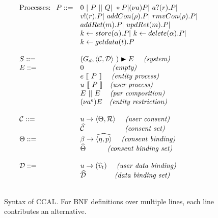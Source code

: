 \vspace{-8mm}
\begin{figure}[H]
\begin{equation*}
\begin{array}{lll}
\textrm{Processes: } \  P ::=  & 0  \ | \  P \ || \ Q  | \  * P  |  (\nu a) P |   \ a?(r). P  | & \\    
& v !( r ). P  | \ addCon(\rho). P  | \ rmvCon(\rho). P |& \\
& addRet(m). P  | \ updRet(m). P  |& \\
& k \leftarrow store(\alpha)  . P |   \ k \leftarrow delete(\alpha) . P  | &\\
&   k \leftarrow getdata(t). P &\\
 & & \\
S  :: =    & (G_d ,  \langle   \mathcal{C} , \mathcal{D} \rangle\ )  \blacktriangleright E  \ \ \ \textit{ (system)}  \\
E  ::= &   0  \quad  \quad \qquad  \textit{(empty) } \\
    &  e \ [\![  \ P \  ]\!]      \quad  \textit{ (entity process) } \\
    &  u \ [\![  \ P \  ]\!]     \ \   \textit{ (user process) } \\
    &  E  \ || \ E   \quad  \textit{ (par composition)}\\
    &  (\nu a^e) E  \quad  \textit{(entity restriction) }\\
   &  \\
 \mathcal{C} :: = & u \to \langle \Theta , \mathcal{R} \rangle \quad \textit{ (user consent) }  \\
   &    \widehat{\mathcal{C}} \ \qquad  \quad  \qquad \textit{ (consent set)} \\
   \Theta :: = & \beta \to \widehat{\langle \eta , p \rangle }  \quad \textit{ (consent binding) }  \\
    & \widehat{ \Theta} \ \  \quad \quad \textit{ (consent binding set)} \\
    &  \\
  \mathcal{D} :: = &  u \to (\widehat{v}_t ) \quad   \textit{ (user data binding) }  \\
  &   \widehat{\mathcal{D}} \ \ \quad \quad \quad \textit{ (data binding set)} \\
    &  \\
\end{array}
\end{equation*}
\caption{Syntax of CCAL.
For BNF definitions over multiple lines,
each line contributes an alternative.
\label{fig:sytx}}
\end{figure}



